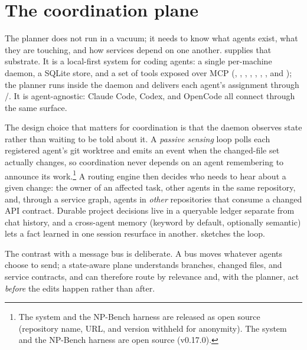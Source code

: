 \section{The coordination plane}
\label{sec:system}

The planner does not run in a vacuum; it needs to know what agents exist, what they are touching,
and how services depend on one another. \sysname supplies that substrate. It is a local-first
system for coding agents: a single per-machine daemon, a SQLite store, and a set of
tools exposed over MCP (, , , ,
, , , and ); the planner runs inside the daemon
and delivers each agent's assignment through /. It is
agent-agnostic: Claude Code, Codex, and OpenCode all connect through the same surface.

The design choice that matters for coordination is that the daemon observes state rather than
waiting to be told about it. A \emph{passive sensing} loop polls each registered agent's git
worktree and emits an event when the changed-file set actually changes, so coordination never
depends on an agent remembering to announce its work.\footnote{\ifanon The system and the NP-Bench
harness are released as open source (repository name, URL, and version withheld for anonymity).\else
The system and the NP-Bench harness are open source (\sysname v0.17.0).\fi} A routing engine then decides who
needs to hear about a given change: the owner of an affected task, other agents in the
same repository, and, through a service graph, agents in \emph{other} repositories that consume a
changed API contract. Durable project decisions live in a queryable ledger separate from chat
history, and a cross-agent memory (keyword by default, optionally semantic) lets a fact learned in
one session resurface in another.  sketches the loop.

The contrast with a message bus is deliberate. A bus moves whatever agents choose to send; a
state-aware plane understands branches, changed files, and service contracts, and can therefore
route by relevance and, with the planner, act \emph{before} the edits happen rather than after.

